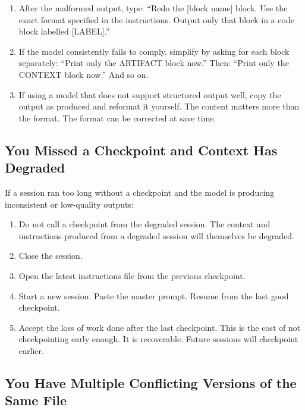 \documentclass[12pt,letterpaper]{article}
\begin{document}
\begin{enumerate}
  \item After the malformed output, type: ``Redo the [block name] block.
        Use the exact format specified in the instructions. Output only
        that block in a code block labelled [LABEL].''

  \item If the model consistently fails to comply, simplify by asking for
        each block separately: ``Print only the ARTIFACT block now.''
        Then: ``Print only the CONTEXT block now.'' And so on.

  \item If using a model that does not support structured output well,
        copy the output as produced and reformat it yourself. The content
        matters more than the format. The format can be corrected at save time.
\end{enumerate}

\subsection{You Missed a Checkpoint and Context Has Degraded}

If a session ran too long without a checkpoint and the model is producing
inconsistent or low-quality outputs:

\begin{enumerate}
  \item Do not call a checkpoint from the degraded session.
        The context and instructions produced from a degraded session
        will themselves be degraded.

  \item Close the session.

  \item Open the latest instructions file from the previous checkpoint.

  \item Start a new session. Paste the master prompt. Resume from the
        last good checkpoint.

  \item Accept the loss of work done after the last checkpoint.
        This is the cost of not checkpointing early enough.
        It is recoverable. Future sessions will checkpoint earlier.
\end{enumerate}

\subsection{You Have Multiple Conflicting Versions of the Same File}
\end{document}
